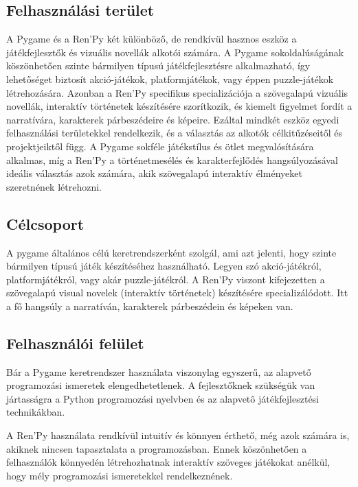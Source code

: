 \subsection{Felhasználási terület}
\indent \indent A Pygame és a Ren'Py két különböző, de rendkívül hasznos eszköz a játékfejlesztők és vizuális novellák alkotói számára. A Pygame sokoldalúságának köszönhetően szinte bármilyen típusú játékfejlesztésre alkalmazható, így lehetőséget biztosít akció-játékok, platformjátékok, vagy éppen puzzle-játékok létrehozására. Azonban a Ren'Py specifikus specializációja a szövegalapú vizuális novellák, interaktív történetek készítésére szorítkozik, és kiemelt figyelmet fordít a narratívára, karakterek párbeszédeire és képeire. Ezáltal mindkét eszköz egyedi felhasználási területekkel rendelkezik, és a választás az alkotók célkitűzéseitől és projektjeiktől függ. A Pygame sokféle játékstílus és ötlet megvalósítására alkalmas, míg a Ren'Py a történetmesélés és karakterfejlődés hangsúlyozásával ideális választás azok számára, akik szövegalapú interaktív élményeket szeretnének létrehozni.

\subsection{Célcsoport}

\indent \indent A pygame általános célú keretrendszerként szolgál, ami azt jelenti, hogy szinte bármilyen típusú játék készítéséhez használható. Legyen szó akció-játékról, platformjátékról, vagy akár puzzle-játékról.
A Ren'Py viszont kifejezetten a szövegalapú visual novelek (interaktív történetek) készítésére specializálódott. Itt a fő hangsúly a narratíván, karakterek párbeszédein és képeken van.

\subsection{Felhasználói felület}

\indent \indent Bár a Pygame keretrendszer használata viszonylag egyszerű, az alapvető programozási ismeretek elengedhetetlenek. A fejlesztőknek szükségük van jártasságra a Python programozási nyelvben és az alapvető játékfejlesztési technikákban.

A Ren'Py használata rendkívül intuitív és könnyen érthető, még azok számára is, akiknek nincsen tapasztalata a programozásban. Ennek köszönhetően a felhasználók könnyedén létrehozhatnak interaktív szöveges játékokat anélkül, hogy mély programozási ismeretekkel rendelkeznének.
